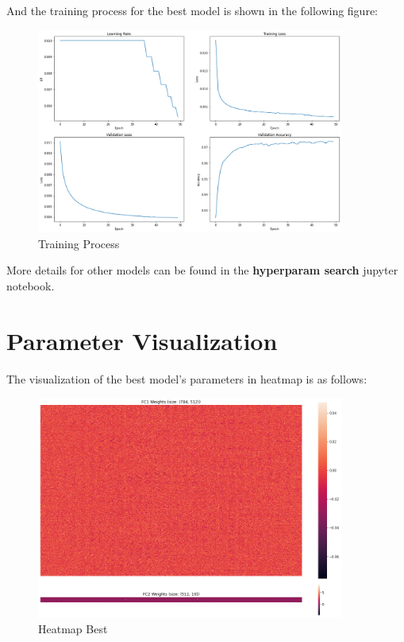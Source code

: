 \documentclass[a4paper, 11pt]{article} %
\begin{document}
And the training process for the best model is shown in the following figure:

\begin{figure}[H]
	\centering
	\includegraphics[width=0.9\textwidth]{./img/train-process.png}
	\caption{Training Process}
\end{figure}

More details for other models can be found in the \textbf{hyperparam search} jupyter notebook.

\bigskip


\section{\textbf{Parameter Visualization}}

The visualization of the best model's parameters in heatmap is as follows:

\begin{figure}[H]
	\centering
	\includegraphics[width=0.9\textwidth]{./img/heatmap-512.png}
	\caption{Heatmap Best}
\end{figure}
\end{document}
